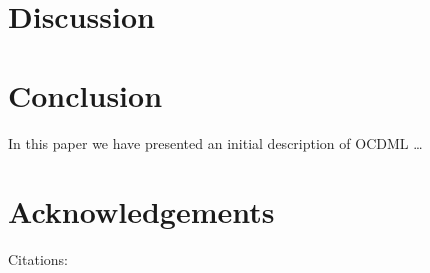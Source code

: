 \documentclass[11pt]{article}
\begin{document}

\section{Discussion} %
\label{sec:discussion}




\section{Conclusion} %
\label{sec:conclusion}
In this paper we have presented an initial description of OCDML \ldots

\section*{Acknowledgements} %
\label{sec:acknowledgements}

Citations:
\cite{cohn1997qualitative}
\cite{isli2000new}
\cite{cristani2002spaceml}
\cite{slobin2001sign}
\cite{mani2010spatialml}
\cite{talmy1978figure}
\cite{herskovits1980spatial}
\cite{stubbs2011mae}




\end{document}
